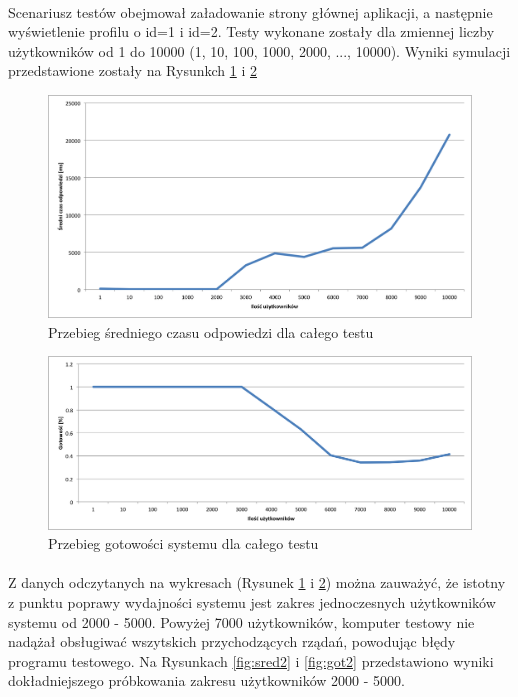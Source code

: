  \paragraph{} %
 \label{par:}
 Scenariusz testów obejmował załadowanie strony głównej aplikacji, a następnie wyświetlenie profilu o id=1 i id=2. Testy wykonane zostały dla zmiennej liczby użytkowników od 1 do 10000 (1, 10, 100, 1000, 2000, ..., 10000). Wyniki symulacji przedstawione zostały na Rysunkch \ref{fig:sred1} i \ref{fig:got1}

\begin{figure}[ht]
	\centering
		\includegraphics[width=1\linewidth]{assets/sredni1.png}
		\caption{Przebieg średniego czasu odpowiedzi dla całego testu}
	\label{fig:sred1}
\end{figure}

\begin{figure}[ht]
	\centering
		\includegraphics[width=1\linewidth]{assets/gotowosc1.png}
		\caption{Przebieg gotowości systemu dla całego testu}
	\label{fig:got1}
\end{figure}

\paragraph{} %
\label{par:}
Z danych odczytanych na wykresach (Rysunek \ref{fig:sred1} i \ref{fig:got1}) można zauważyć, że istotny z punktu poprawy wydajności systemu jest zakres jednoczesnych użytkowników systemu od 2000 - 5000. Powyżej 7000 użytkowników, komputer testowy nie nadążał obsługiwać wszytskich przychodzących rządań, powodując błędy programu testowego. Na Rysunkach \ref{fig:sred2} i \ref{fig:got2} przedstawiono wyniki dokładniejszego próbkowania zakresu użytkowników 2000 - 5000.

